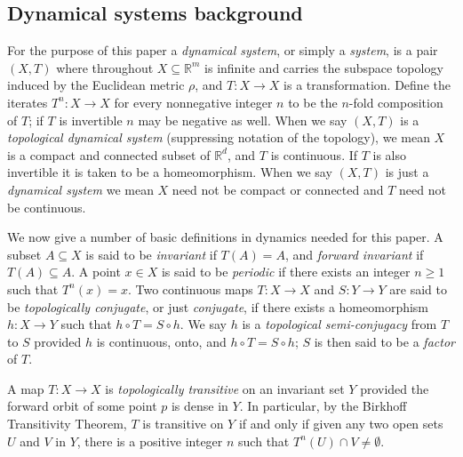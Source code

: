 \documentclass{amsart}
\theoremstyle{theorem}
\theoremstyle{remark}
\numberwithin{equation}{section}
\newcommand{\RR}{\mathbb{R}}
\begin{document}
\subsection{Dynamical systems background}

For the purpose of this paper a \emph{dynamical system}, or simply a \emph{system}, is a pair $(X, T)$ where throughout $X\subseteq \RR^m$ is infinite and carries the subspace topology induced by the Euclidean metric $\rho$, and $T:X \rightarrow X$ is a transformation. Define the iterates $T^n:X \rightarrow X$ for every nonnegative integer $n$ to be the $n$-fold composition of $T$; if $T$ is invertible $n$ may be negative as well.
When we say $(X, T)$ is a \emph{topological dynamical system} (suppressing notation of the topology), we mean $X$ is a compact and connected subset of $\RR^d$, and $T$ is continuous. If $T$ is also invertible it is taken to be a homeomorphism.
When we say $(X, T)$ is just a \emph{dynamical system} we mean $X$ need not be compact or connected and $T$ need not be continuous.

We now give a number of basic definitions in dynamics needed for this paper.
A subset $A \subseteq X$ is said to be \emph{invariant} if $T(A) = A$, and \emph{forward invariant} if $T(A) \subseteq A$. A point $x \in X$ is said to be \emph{periodic} if there exists an integer $n \geq 1$ such that $T^n(x) = x$.
Two continuous maps $T:X \rightarrow X$ and $S:Y \rightarrow Y$ are said to be \emph{topologically conjugate}, or just \emph{conjugate}, if there exists a homeomorphism $h:X \rightarrow Y$ such that $h\circ T = S \circ h$. We say $h$ is a \emph{topological semi-conjugacy} from $T$ to $S$ provided $h$ is continuous, onto, and $h\circ T = S \circ h$; $S$ is then said to be a \emph{factor} of $T$.

A map $T:X \rightarrow X$ is \emph{topologically transitive} on an invariant set $Y$ provided the forward orbit of some point $p$ is dense in $Y$. In particular, by the Birkhoff Transitivity Theorem, $T$ is transitive on $Y$ if and only if given any two open sets $U$ and $V$ in $Y$, there is a positive integer $n$ such that $T^n(U) \cap V \neq \emptyset$.
\end{document}

